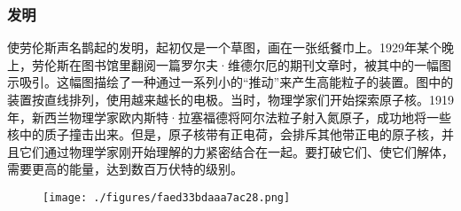 \subsubsection{发明}
使劳伦斯声名鹊起的发明，起初仅是一个草图，画在一张纸餐巾上。1929年某个晚上，劳伦斯在图书馆里翻阅一篇罗尔夫·维德尔厄的期刊文章时，被其中的一幅图示吸引。这幅图描绘了一种通过一系列小的“推动”来产生高能粒子的装置。图中的装置按直线排列，使用越来越长的电极。当时，物理学家们开始探索原子核。1919年，新西兰物理学家欧内斯特·拉塞福德将阿尔法粒子射入氮原子，成功地将一些核中的质子撞击出来。但是，原子核带有正电荷，会排斥其他带正电的原子核，并且它们通过物理学家刚开始理解的力紧密结合在一起。要打破它们、使它们解体，需要更高的能量，达到数百万伏特的级别。
\begin{figure}[ht]
\centering
\texttt{[image: ./figures/faed33bdaaa7ac28.png]}
\caption{} \label{fig_ONST_1}
\end{figure}